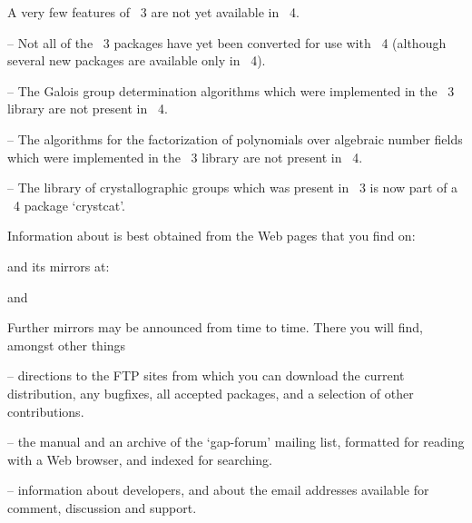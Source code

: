 A very few features of {\GAP}~3 are not yet available in  {\GAP}~4.

\beginlist%
   \item{--}
     Not all of the {\GAP}~3 packages have yet been converted
     for use with  {\GAP}~4 (although several new packages are available
     only in  {\GAP}~4). 

   \item{--} The Galois group determination algorithms which were
      implemented in the {\GAP}~3 library are not present in {\GAP}~4.
    
   \item{--} The algorithms for the factorization of polynomials over
   algebraic number fields which were implemented in the {\GAP}~3 library
   are not present in {\GAP}~4.

   \item{--} The library of crystallographic groups which was present in
     {\GAP}~3 is now part of a {\GAP}~4 package `crystcat'.

\endlist



Information about {\GAP} is best obtained from the {\GAP} Web pages that
you find on:


and its mirrors at:

 and



Further mirrors may be announced from time to time. There you will
find, amongst other things
\beginlist%
\item{--} directions to the FTP sites from which you can download the
current {\GAP} distribution, any bugfixes, all accepted {\GAP} packages,
and a selection of other contributions.
\item{--} the {\GAP} manual and an archive of the `gap-forum' mailing
list, formatted for reading with a Web browser, and indexed for
searching.
\item{--} information about {\GAP} developers, and about the email
addresses available for comment, discussion and support.
\endlist


